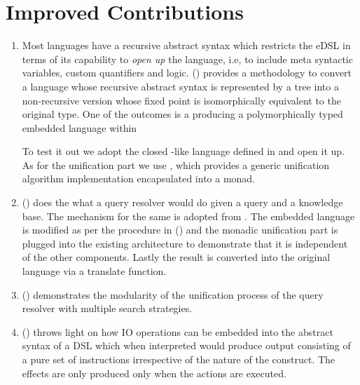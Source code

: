 \documentclass[thesis-solanki.tex]{subfiles}
\begin{document}
\section{Improved Contributions}
\begin{enumerate}
\item
  Most languages have a recursive abstract syntax which restricts the eDSL
  in terms of its capability to
  \textit{open up} the language{\large,} i.e{\large,}
  to include meta syntactic variables, custom quantifiers and logic.
  () provides a methodology to convert a language whose recursive abstract
  syntax is represented by a tree into a non-recursive version whose fixed point is isomorphically equivalent to
  the original type.
  One of the outcomes is a producing a polymorphically typed embedded language within 

  To test it out we adopt the closed -like language defined in \cite{prolog-lib} and open it up.
  As for the unification part we use \cite{unification-fd-lib}, which provides a generic unification algorithm
  implementation encapsulated into a monad.

\item
  () does the what a  query resolver would do given a
  query and a knowledge base.
  The mechanism for the same is adopted from \cite{prolog-lib}.
  The embedded language is modified as per the procedure in () and the
  monadic unification part is plugged into the existing architecture to demonstrate that it is independent of the
  other components.
  Lastly the result is converted into the original language via a translate function.

\item
  () demonstrates the modularity of the unification process of the query
  resolver with multiple search strategies.

\item
  () throws light on how IO operations can be embedded into the abstract
  syntax of a DSL which when interpreted would produce output consisting of a pure set of instructions irrespective
  of the nature of the construct.
  The effects are only produced only when the actions are executed.
\end{enumerate}
\end{document}
